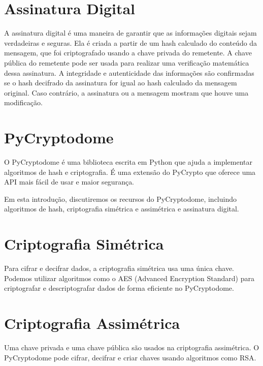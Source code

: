 \documentclass[a4paper,12pt]{article}
\begin{document}
\section{Assinatura Digital}
\hspace{0.5cm}A assinatura digital é uma maneira de garantir que as informações 
digitais sejam verdadeiras e seguras. Ela é criada a partir de um hash calculado 
do conteúdo da mensagem, que foi criptografado usando a chave privada do remetente. 
A chave pública do remetente pode ser usada para realizar uma verificação matemática 
dessa assinatura. A integridade e autenticidade das informações são confirmadas se o 
hash decifrado da assinatura for igual ao hash calculado da mensagem original. Caso 
contrário, a assinatura ou a mensagem mostram que houve uma modificação.

\section{PyCryptodome}
O PyCryptodome é uma biblioteca escrita em Python que ajuda a implementar algoritmos 
de hash e criptografia. É uma extensão do PyCrypto que oferece uma API mais fácil de 
usar e maior segurança.

Em esta introdução, discutiremos os recursos do PyCryptodome, incluindo algoritmos 
de hash, criptografia simétrica e assimétrica e assinatura digital.

\section{Criptografia Simétrica}
Para cifrar e decifrar dados, a criptografia simétrica usa uma única chave. Podemos 
utilizar algoritmos como o AES (Advanced Encryption Standard) para criptografar e 
descriptografar dados de forma eficiente no PyCryptodome.

\section{Criptografia Assimétrica}
Uma chave privada e uma chave pública são usados na criptografia assimétrica. O 
PyCryptodome pode cifrar, decifrar e criar chaves usando algoritmos como RSA.
\end{document}
